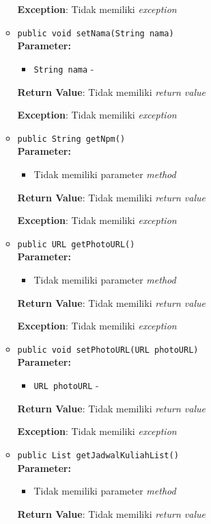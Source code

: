 \documentclass{article}
\begin{document}
\begin{enumerate}
\begin{itemize}
\textbf{Exception}: Tidak memiliki \textit{exception}

\item \texttt{public void setNama(String nama)}\\ 


\textbf{Parameter:}\begin{itemize}
\item \texttt{String nama} - 
\end{itemize}
\textbf{Return Value}: Tidak memiliki \textit{return value}

\textbf{Exception}: Tidak memiliki \textit{exception}

\item \texttt{public String getNpm()}\\ 


\textbf{Parameter:}\begin{itemize}
\item Tidak memiliki parameter \textit{method}
\end{itemize}
\textbf{Return Value}: Tidak memiliki \textit{return value}

\textbf{Exception}: Tidak memiliki \textit{exception}

\item \texttt{public URL getPhotoURL()}\\ 


\textbf{Parameter:}\begin{itemize}
\item Tidak memiliki parameter \textit{method}
\end{itemize}
\textbf{Return Value}: Tidak memiliki \textit{return value}

\textbf{Exception}: Tidak memiliki \textit{exception}

\item \texttt{public void setPhotoURL(URL photoURL)}\\ 


\textbf{Parameter:}\begin{itemize}
\item \texttt{URL photoURL} - 
\end{itemize}
\textbf{Return Value}: Tidak memiliki \textit{return value}

\textbf{Exception}: Tidak memiliki \textit{exception}

\item \texttt{public List getJadwalKuliahList()}\\ 


\textbf{Parameter:}\begin{itemize}
\item Tidak memiliki parameter \textit{method}
\end{itemize}
\textbf{Return Value}: Tidak memiliki \textit{return value}


\end{itemize}
\end{enumerate}
\end{document}
